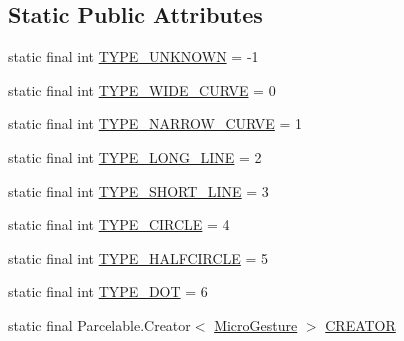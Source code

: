 \subsection*{Static Public Attributes}
\begin{DoxyCompactItemize}
\item 
static final int \hyperlink{classch_1_1zhaw_1_1ba10__bsha__1_1_1service_1_1MicroGesture_a5f903774e82629582f34b094f636cc07}{TYPE\_\-UNKNOWN} = -\/1
\item 
static final int \hyperlink{classch_1_1zhaw_1_1ba10__bsha__1_1_1service_1_1MicroGesture_ae0758406e65bb8e4620eae33908ee771}{TYPE\_\-WIDE\_\-CURVE} = 0
\item 
static final int \hyperlink{classch_1_1zhaw_1_1ba10__bsha__1_1_1service_1_1MicroGesture_a10ec4946fe85b4cce6759af9ed1af09f}{TYPE\_\-NARROW\_\-CURVE} = 1
\item 
static final int \hyperlink{classch_1_1zhaw_1_1ba10__bsha__1_1_1service_1_1MicroGesture_a7aa282efbebb6c0ed0fcce9ad05f0769}{TYPE\_\-LONG\_\-LINE} = 2
\item 
static final int \hyperlink{classch_1_1zhaw_1_1ba10__bsha__1_1_1service_1_1MicroGesture_a028fbfbef81cd5bfd3d2d456d7109ed2}{TYPE\_\-SHORT\_\-LINE} = 3
\item 
static final int \hyperlink{classch_1_1zhaw_1_1ba10__bsha__1_1_1service_1_1MicroGesture_ac8268cb939b8bae2cf1791b4bbeb422d}{TYPE\_\-CIRCLE} = 4
\item 
static final int \hyperlink{classch_1_1zhaw_1_1ba10__bsha__1_1_1service_1_1MicroGesture_aa2babf7288fba5f44c2fd20f29f49386}{TYPE\_\-HALFCIRCLE} = 5
\item 
static final int \hyperlink{classch_1_1zhaw_1_1ba10__bsha__1_1_1service_1_1MicroGesture_a18689e75216da1fea6b0706ca6fc95fe}{TYPE\_\-DOT} = 6
\item 
static final Parcelable.Creator$<$ \hyperlink{classch_1_1zhaw_1_1ba10__bsha__1_1_1service_1_1MicroGesture}{MicroGesture} $>$ \hyperlink{classch_1_1zhaw_1_1ba10__bsha__1_1_1service_1_1MicroGesture_a017ccacff6d5f99fd9ee14943767feab}{CREATOR}
\end{DoxyCompactItemize}

